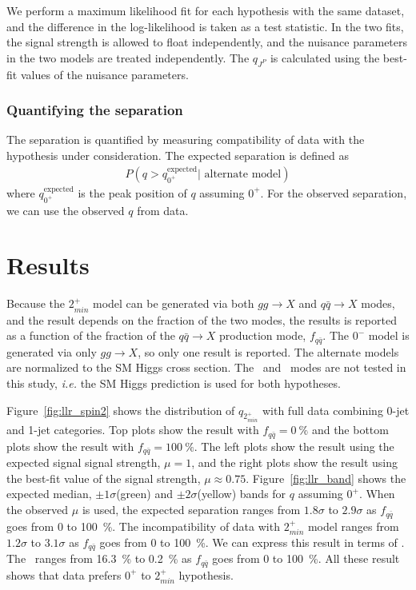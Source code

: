 We perform a maximum likelihood fit for each hypothesis with the same dataset,
and the difference in the log-likelihood is taken as a test statistic. 
In the two fits, the signal strength is allowed to float independently, 
and the nuisance parameters in the two models are treated independently. 
The $q_{J^P}$ is calculated using the best-fit values of the nuisance parameters. 

\subsubsection{Quantifying the separation}

The separation is quantified by measuring compatibility of data with 
the hypothesis under consideration. The expected separation is defined as  
\begin{eqnarray} 
P(q > q_{0^+}^{\textrm{expected}} | \textrm{ alternate model}) 
\end{eqnarray} 
where $q_{0^+}^{\textrm{expected}}$ is the peak position of $q$ assuming $0^+$.
For the observed separation, we can use the observed $q$ from data. 

\section{Results}

Because the $2_{min}^+$ model can be generated via both $gg\rightarrow X$ 
and $q\bar{q }\rightarrow X$ modes, and the result depends on the fraction of the two modes, 
the results is reported as a function of the fraction of the $q\bar{q} \rightarrow X$ production mode, 
$f_{q\bar{q}}$. The $0^-$ model is generated via only $gg\rightarrow X$,
so only one result is reported. The alternate models are normalized to the 
SM Higgs cross section. The \qqH\ and \qqVH\ modes are not tested in this study, 
\textit{i.e.} the SM Higgs prediction is used for both hypotheses. 

Figure~\ref{fig:llr_spin2} shows the distribution of $q_{2_{min}^+}$ with full data 
combining 0-jet and 1-jet categories. 
Top plots show the result with $f_{q\bar{q}}=0~\%$ and the bottom plots show 
the result with $f_{q\bar{q}}=100~\%$. The left plots show the result using the 
expected signal signal strength, $\mu=1$, 
and the right plots show the result using the best-fit value of the signal strength, 
$\mu \approx 0.75$.  
Figure~\ref{fig:llr_band} shows the expected median, $\pm1\sigma$(green) 
and  $\pm2\sigma$(yellow) bands for $q$ assuming $0^+$. 
When the observed $\mu$ is used, the expected separation ranges from 
$1.8\sigma$ to $2.9\sigma$ as $f_{q\bar{q}}$ goes from 0 to 100~\%.
The incompatibility of data with $2_{min}^+$ model ranges from  
$1.2\sigma$ to $3.1\sigma$ as $f_{q\bar{q}}$ goes from 0 to 100~\%.
We can express this result in terms of \CLs. The \CLs\ ranges from 
16.3~\% to 0.2~\% as $f_{q\bar{q}}$ goes from 0 to 100~\%.
All these result shows that data prefers $0^+$ to $2_{min}^+$ hypothesis.  

